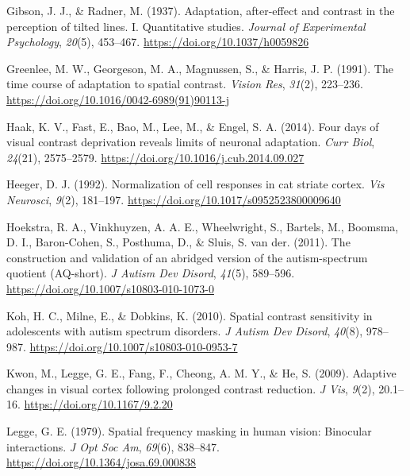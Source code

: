 \documentclass[
]{article}
\newlength{\cslhangindent}
\newlength{\cslentryspacingunit} %
\newenvironment{CSLReferences}[2] %
 {%
  \setlength{\parindent}{0pt}
  \ifodd #1
  \let\oldpar\par
  \def\par{\hangindent=\cslhangindent\oldpar}
  \fi
  \setlength{\parskip}{#2\cslentryspacingunit}
 }%
 {}
\begin{document}
\begin{CSLReferences}{1}{0}
\leavevmode{}%
Gibson, J. J., \& Radner, M. (1937). Adaptation, after-effect and contrast in the perception of tilted lines. {I}. {Quantitative} studies. \emph{Journal of Experimental Psychology}, \emph{20}(5), 453--467. \url{https://doi.org/10.1037/h0059826}

\leavevmode{}%
Greenlee, M. W., Georgeson, M. A., Magnussen, S., \& Harris, J. P. (1991). The time course of adaptation to spatial contrast. \emph{Vision Res}, \emph{31}(2), 223--236. \url{https://doi.org/10.1016/0042-6989(91)90113-j}

\leavevmode{}%
Haak, K. V., Fast, E., Bao, M., Lee, M., \& Engel, S. A. (2014). Four days of visual contrast deprivation reveals limits of neuronal adaptation. \emph{Curr Biol}, \emph{24}(21), 2575--2579. \url{https://doi.org/10.1016/j.cub.2014.09.027}

\leavevmode{}%
Heeger, D. J. (1992). Normalization of cell responses in cat striate cortex. \emph{Vis Neurosci}, \emph{9}(2), 181--197. \url{https://doi.org/10.1017/s0952523800009640}

\leavevmode{}%
Hoekstra, R. A., Vinkhuyzen, A. A. E., Wheelwright, S., Bartels, M., Boomsma, D. I., Baron-Cohen, S., Posthuma, D., \& Sluis, S. van der. (2011). The construction and validation of an abridged version of the autism-spectrum quotient (AQ-short). \emph{J Autism Dev Disord}, \emph{41}(5), 589--596. \url{https://doi.org/10.1007/s10803-010-1073-0}

\leavevmode{}%
Koh, H. C., Milne, E., \& Dobkins, K. (2010). Spatial contrast sensitivity in adolescents with autism spectrum disorders. \emph{J Autism Dev Disord}, \emph{40}(8), 978--987. \url{https://doi.org/10.1007/s10803-010-0953-7}

\leavevmode{}%
Kwon, M., Legge, G. E., Fang, F., Cheong, A. M. Y., \& He, S. (2009). Adaptive changes in visual cortex following prolonged contrast reduction. \emph{J Vis}, \emph{9}(2), 20.1--16. \url{https://doi.org/10.1167/9.2.20}

\leavevmode{}%
Legge, G. E. (1979). Spatial frequency masking in human vision: Binocular interactions. \emph{J Opt Soc Am}, \emph{69}(6), 838--847. \url{https://doi.org/10.1364/josa.69.000838}


\end{CSLReferences}
\end{document}
